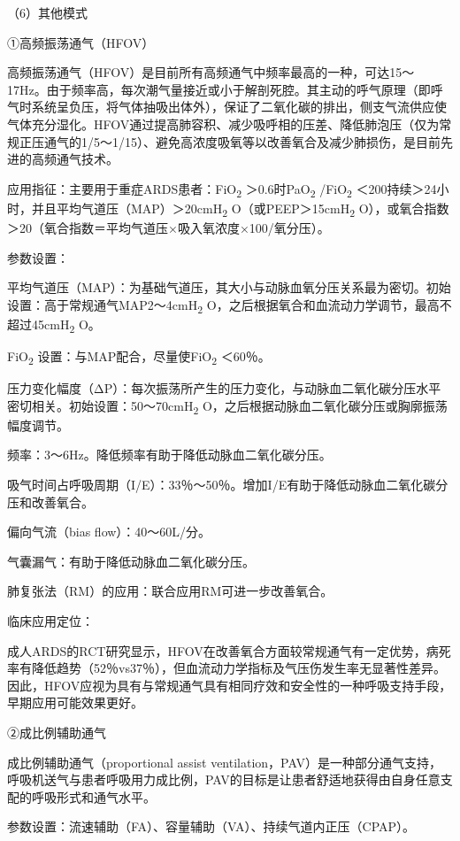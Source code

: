 （6）其他模式

①高频振荡通气（HFOV）

高频振荡通气（HFOV）是目前所有高频通气中频率最高的一种，可达15～17Hz。由于频率高，每次潮气量接近或小于解剖死腔。其主动的呼气原理（即呼气时系统呈负压，将气体抽吸出体外），保证了二氧化碳的排出，侧支气流供应使气体充分湿化。HFOV通过提高肺容积、减少吸呼相的压差、降低肺泡压（仅为常规正压通气的1/5～1/15）、避免高浓度吸氧等以改善氧合及减少肺损伤，是目前先进的高频通气技术。

应用指征：主要用于重症ARDS患者：FiO\textsubscript{2}
＞0.6时PaO\textsubscript{2} /FiO\textsubscript{2}
＜200持续＞24小时，并且平均气道压（MAP）＞20cmH\textsubscript{2}
O（或PEEP＞15cmH\textsubscript{2}
O），或氧合指数＞20（氧合指数＝平均气道压×吸入氧浓度×100/氧分压）。

参数设置：

平均气道压（MAP）：为基础气道压，其大小与动脉血氧分压关系最为密切。初始设置：高于常规通气MAP2～4cmH\textsubscript{2}
O，之后根据氧合和血流动力学调节，最高不超过45cmH\textsubscript{2} O。

FiO\textsubscript{2} 设置：与MAP配合，尽量使FiO\textsubscript{2}
＜60％。

压力变化幅度（ΔP）：每次振荡所产生的压力变化，与动脉血二氧化碳分压水平密切相关。初始设置：50～70cmH\textsubscript{2}
O，之后根据动脉血二氧化碳分压或胸廓振荡幅度调节。

频率：3～6Hz。降低频率有助于降低动脉血二氧化碳分压。

吸气时间占呼吸周期（I/E）：33％～50％。增加I/E有助于降低动脉血二氧化碳分压和改善氧合。

偏向气流（bias flow）：40～60L/分。

气囊漏气：有助于降低动脉血二氧化碳分压。

肺复张法（RM）的应用：联合应用RM可进一步改善氧合。

临床应用定位：

成人ARDS的RCT研究显示，HFOV在改善氧合方面较常规通气有一定优势，病死率有降低趋势（52％vs37％），但血流动力学指标及气压伤发生率无显著性差异。因此，HFOV应视为具有与常规通气具有相同疗效和安全性的一种呼吸支持手段，早期应用可能效果更好。

②成比例辅助通气

成比例辅助通气（proportional assist
ventilation，PAV）是一种部分通气支持，呼吸机送气与患者呼吸用力成比例，PAV的目标是让患者舒适地获得由自身任意支配的呼吸形式和通气水平。

参数设置：流速辅助（FA）、容量辅助（VA）、持续气道内正压（CPAP）。

